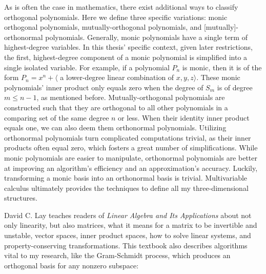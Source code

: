 \documentclass[letterpaper, 12pt]{article}
\begin{document}
\noindent As is often the case in mathematics, there exist additional ways to classify orthogonal polynomials. Here we define three specific variations: monic orthogonal polynomials, mutually-orthogonal polynomials, and [mutually]-orthonormal polynomials. Generally, monic polynomials have a single term of highest-degree variables. In this thesis' specific context, given later restrictions, the first, highest-degree component of a monic polynomial is simplified into a single isolated variable. For example, if a polynomial $P_n$ is monic, then it is of the form $P_n = x^n + \langle$ a lower-degree linear combination of $x, y, z \rangle$. These monic polynomials' inner product only equals zero when the degree of $S_m$ is of degree $m \leq n-1$, as mentioned before. Mutually-orthogonal polynomials are constructed such that they are orthogonal to all other polynomials in a comparing set of the same degree $n$ or less. When their identity inner product equals one, we can also deem them orthonormal polynomials. Utilizing orthonormal polynomials turn complicated computations trivial, as their inner products often equal zero, which fosters a great number of simplifications. While monic polynomials are easier to manipulate, orthonormal polynomials are better at improving an algorithm's efficiency and an approximation's accuracy. Luckily, transforming a monic basis into an orthonormal basis is trivial. Multivariable calculus ultimately provides the techniques to define all my three-dimensional structures.

David C. Lay teaches readers of \textit{Linear Algebra and Its Applications} \cite{lay} about not only linearity, but also matrices, what it means for a matrix to be invertible and unstable, vector spaces, inner product spaces, how to solve linear systems, and property-conserving transformations. This textbook also describes algorithms vital to my research, like the Gram-Schmidt process, which produces an orthogonal basis for any nonzero subspace:
\end{document}
